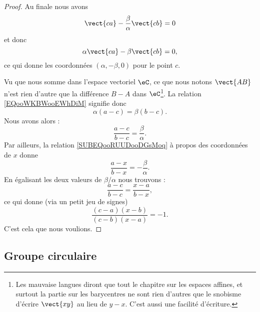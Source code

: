 \begin{proof}
    Au finale nous avons
    \begin{equation}
        \vect{ ca }-\frac{ \beta }{ \alpha }\vect{ cb }=0
    \end{equation}
    et donc
    \begin{equation}        \label{EQooWKBWooEWhDiM}
        \alpha\vect{ ca }-\beta\vect{ cb }=0,
    \end{equation}
    ce qui donne les coordonnées \( (\alpha,-\beta,0)\) pour le point \( c\).

    Vu que nous somme dans l'espace vectoriel \( \eC\), ce que nous notons \( \vect{ AB }\) n'est rien d'autre que la différence \( B-A\) dans \( \eC\)\footnote{Les mauvaise langues diront que tout le chapitre sur les espaces affines, et surtout la partie sur les barycentres ne sont rien d'autres que le snobisme d'écrire \( \vect{ xy }\) au lieu de \( y-x\). C'est aussi une facilité d'écriture.}. La relation \eqref{EQooWKBWooEWhDiM} signifie donc
    \begin{equation}
        \alpha(a-c)=\beta(b-c).
    \end{equation}
    Nous avons alors :
    \begin{equation}
        \frac{ a-c }{ b-c }=\frac{ \beta }{ \alpha }.
    \end{equation}
    Par ailleurs, la relation \eqref{SUBEQooRUUDooDGsMoq} à propos des coordonnées de \( x\) donne
    \begin{equation}
        \frac{ a-x }{ b-x }=-\frac{ \beta }{ \alpha }.
    \end{equation}
    En égalisant les deux valeurs de \( \beta/\alpha\) nous trouvons :
    \begin{equation}
        \frac{ a-c }{ b-c }=\frac{ x-a }{ b-x },
    \end{equation}
    ce qui donne (via un petit jeu de signes)
    \begin{equation}
        \frac{ (c-a)(x-b) }{ (c-b)(x-a) }=-1.
    \end{equation}
    C'est cela que nous voulions.
\end{proof}

\subsection{Groupe circulaire}

